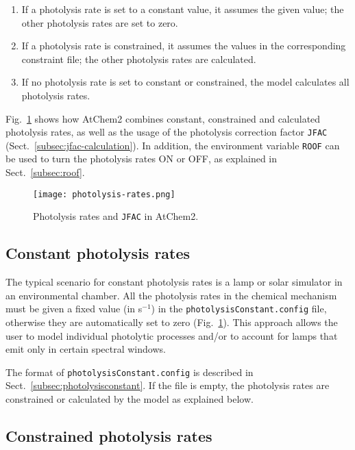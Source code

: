 \begin{enumerate}
\item If a photolysis rate is set to a constant value, it assumes the
  given value; the other photolysis rates are set to zero.
\item If a photolysis rate is constrained, it assumes the values in
  the corresponding constraint file; the other photolysis rates are
  calculated.
\item If no photolysis rate is set to constant or constrained, the
  model calculates all photolysis rates.
\end{enumerate}

Fig.~\ref{fig:photol} shows how AtChem2 combines constant, constrained
and calculated photolysis rates, as well as the usage of the photolysis
correction factor \texttt{JFAC} (Sect.~\ref{subsec:jfac-calculation}).
In addition, the environment variable \texttt{ROOF} can be used to turn
the photolysis rates ON or OFF, as explained in Sect.~\ref{subsec:roof}.

\begin{figure}[htb]
  \centering
  \texttt{[image: photolysis-rates.png]}
  \caption{Photolysis rates and \texttt{JFAC} in AtChem2.}
  \label{fig:photol}
\end{figure}

\subsection{Constant photolysis rates} \label{subsec:constant-photolysis-rates}

The typical scenario for constant photolysis rates is a lamp or solar
simulator in an environmental chamber. All the photolysis rates in the
chemical mechanism must be given a fixed value (in s$^{-1}$) in the
\texttt{photolysisConstant.config} file, otherwise they are
automatically set to zero (Fig.~\ref{fig:photol}). This approach
allows the user to model individual photolytic processes and/or to
account for lamps that emit only in certain spectral windows.

The format of \texttt{photolysisConstant.config} is described in
Sect.~\ref{subsec:photolysisconstant}. If the file is empty, the
photolysis rates are constrained or calculated by the model as
explained below.

\subsection{Constrained photolysis rates} \label{subsec:constrained-photolysis-rates}

